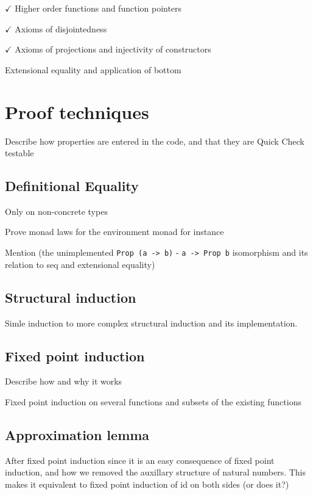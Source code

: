 $\checkmark$ Higher order functions and function pointers

$\checkmark$ Axioms of disjointedness

$\checkmark$ Axioms of projections and injectivity of constructors

Extensional equality and application of bottom

\section{Proof techniques}

Describe how properties are entered in the code, and that they are
Quick Check testable

\subsection{Definitional Equality}

Only on non-concrete types

Prove monad laws for the environment monad for instance

Mention (the unimplemented \verb;Prop (a -> b); - \verb;a -> Prop b;
isomorphism and its relation to seq and extensional equality)

\subsection{Structural induction}

Simle induction to more complex structural induction and its
implementation.

\subsection{Fixed point induction}

Describe how and why it works

Fixed point induction on several functions and subsets of the existing
functions

\subsection{Approximation lemma}

After fixed point induction since it is an easy consequence of fixed
point induction, and how we removed the auxillary structure of natural
numbers. This makes it equivalent to fixed point induction of id on
both sides (or does it?)
